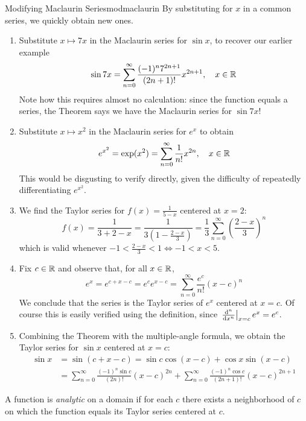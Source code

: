 \begin{examples}{Modifying Maclaurin Series}{modmaclaurin}
By substituting for $x$ in a common series, we quickly obtain new ones.
\begin{enumerate}
  \item Substitute $x\mapsto 7x$ in the Maclaurin series for $\sin x$, to recover our earlier example
 	\[\sin 7x=\sum_{n=0}^\infty\frac{(-1)^n7^{2n+1}}{(2n+1)!}x^{2n+1},\quad x\in \R\]
	Note how this requires almost no calculation: since the function equals a series, the Theorem says we have the Maclaurin series for $\sin 7x$!
	
	\item Substitute $x\mapsto x^2$ in the Maclaurin series for $e^x$ to obtain
  \[e^{x^2}=\exp(x^2)=\sum_{n=0}^\infty \frac{1}{n!}x^{2n},\quad x\in\R\]
  This would be disgusting to verify directly, given the difficulty of repeatedly differentiating $e^{x^2}$.
  
  \item We find the Taylor series for $f(x)=\frac 1{5-x}$ centered at $x=2$:
  \[f(x)=\frac 1{3+2-x} =\frac 1{3(1-\frac{2-x}3)} =\frac 13\sum_{n=0}^\infty\left(\frac{2-x}3\right)^n\]
  which is valid whenever $-1<\frac{2-x}3<1\iff -1<x<5$.
  
  \item Fix $c\in\R$ and observe that, for all $x\in\R$,
  \[e^x=e^{c+x-c}=e^ce^{x-c}=\sum_{n=0}^\infty \frac{e^c}{n!}(x-c)^n\]
  We conclude that the series is the Taylor series of $e^x$ centered at $x=c$. Of course this is easily verified using the definition, since $\diffat[^n]{x^n}{x=c}e^x=e^c$.
  
  \item Combining the Theorem with the multiple-angle formula, we obtain the Taylor series for $\sin x$ centered at $x=c$:
  \begin{align*}
  \sin x&=\sin(c+x-c)=\sin c\cos(x-c)+\cos x\sin(x-c)\\
  &=\sum_{n=0}^\infty\frac{(-1)^n\sin c}{(2n)!}(x-c)^{2n} +\sum_{n=0}^\infty\frac{(-1)^n\cos c}{(2n+1)!}(x-c)^{2n+1}
  \end{align*}
\end{enumerate}
\end{examples}


\begin{defn}{}{}
A function is \emph{analytic} on a domain if for each $c$ there exists a neighborhood of $c$ on which the function equals its Taylor series centered at $c$.
\end{defn} 
	
